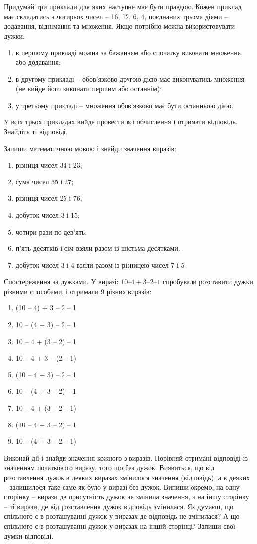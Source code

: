 \problem
Придумай три приклади для яких наступне має бути правдою.
Кожен приклад має складатись з чотирьох чисел – 16, 12, 6, 4,
поєднаних трьома діями – додавання, віднімання та множення.
Якщо потрібно можна використовувати дужки.
\begin{enumerate}
    \item в першому прикладі можна за бажанням або
    спочатку виконати множення, або додавання;
    \item в другому прикладі – обов'язково другою дією має
    виконуватись множення (не вийде його виконати першим або останнім);
    \item у третьому прикладі – множення обов'язково має бути останньою дією.
\end{enumerate}
У всіх трьох прикладах вийде провести всі обчислення і отримати відповідь. Знайдіть ті відповіді.


\problem
Запиши математичною мовою і знайди значення виразів:
\begin{enumerate}
    \item різниця чисел 34 і 23;
    \item сума чисел 35 і 27;
    \item різниця чисел 25 і 76;
    \item добуток чисел 3 і 15;
    \item чотири рази по дев'ять;
    \item п'ять десятків і сім взяли разом із шістьма десятками.
    \item добуток чисел 3 і 4 взяли разом із різницею чисел 7 і 5
\end{enumerate}


\problem
Спостереження за дужками.
У виразі: $10 – 4 + 3 – 2 – 1$ спробували розставити дужки різними способами,
і отримали 9 різних виразів:
\begin{enumerate}
    \item (10 – 4) + 3 – 2 – 1
    \item 10 – (4 + 3) – 2 – 1
    \item 10 – 4 + (3 – 2) – 1
    \item 10 – 4 + 3 – (2 – 1)
    \item (10 – 4 + 3) – 2 – 1
    \item 10 – (4 + 3 – 2) – 1
    \item 10 – 4 + (3 – 2 – 1)
    \item (10 – 4 + 3 – 2) – 1
    \item 10 – (4 + 3 – 2 – 1)
\end{enumerate}
Виконай дії і знайди значення кожного з виразів.
Порівняй отримані відповіді із значенням початкового виразу,
того що без дужок.
Виявиться, що від розставлення дужок в деяких виразах змінилося
значення (відповідь), а в деяких – залишилося таке саме
як було у виразі без дужок.
Випиши окремо, на одну сторінку – вирази де присутність дужок
не змінила значення, а на іншу сторінку – ті вирази,
де від розставлення дужок відповідь змінилася.
Як думаєш, що спільного є в розташуванні дужок у виразах
де відповідь не змінилася?
А що спільного є в розташуванні дужок у виразах на іншій сторінці?
Запиши свої думки-відповіді.


